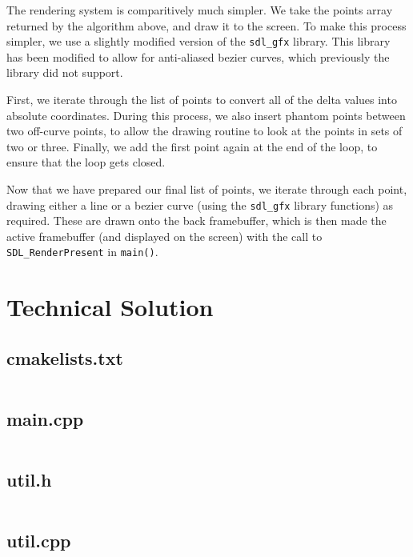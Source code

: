 \documentclass{report}
\begin{document}
The rendering system is comparitively much simpler. We take the points array
returned by the algorithm above, and draw it to the screen. To make this process
simpler, we use a slightly modified version of the \texttt{sdl\_gfx} library.
This library has been modified to allow for anti-aliased bezier curves, which
previously the library did not support. 

First, we iterate through the list of points to convert all of the delta values
into absolute coordinates. During this process, we also insert phantom points
between two off-curve points, to allow the drawing routine to look at the points
in sets of two or three. Finally, we add the first point again at the end of the
loop, to ensure that the loop gets closed.

Now that we have prepared our final list of points, we iterate through each
point, drawing either a line or a bezier curve (using the \texttt{sdl\_gfx}
library functions) as required. These are drawn onto the back framebuffer, which
is then made the active framebuffer (and displayed on the screen) with the call
to \texttt{SDL\_RenderPresent} in \texttt{main()}.

\chapter{Technical Solution}

\localtableofcontents

\section{cmakelists.txt}
\inputminted[linenos, frame=lines, framesep=2mm, breaklines]{cmake}{/home/jake/TTFParser/CMakeLists.txt}

\section{main.cpp}
\inputminted[linenos, frame=lines, framesep=2mm, breaklines, tabsize=4]{cpp}{/home/jake/TTFParser/src/main.cpp}

\section{util.h}
\inputminted[linenos, frame=lines, framesep=2mm, breaklines,
tabsize=4]{cpp}{/home/jake/TTFParser/include/util.h}
\section{util.cpp}
\inputminted[linenos, frame=lines, framesep=2mm, breaklines,
tabsize=4]{cpp}{/home/jake/TTFParser/src/util.cpp}
\end{document}
